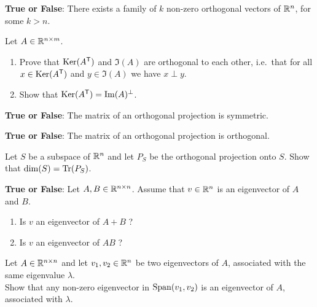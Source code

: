 \documentclass[11pt,nocut]{article}
\begin{document}
\vspace{0.2cm}
\begin{problem}
	\textbf{True or False}: There exists a family of $k$ non-zero orthogonal vectors of $\mathbb{R}^n$, for some $k>n$.
\end{problem}
\vspace{0.2cm}
\begin{problem}
	Let $A \in \mathbb{R}^{n \times m}$.
	\begin{enumerate}
		\item Prove that ${{\rm Ker}}(A^{{\sf T}})$ and $\Im(A)$ are orthogonal to each other, i.e.\ that for all $x \in {{\rm Ker}}(A^{{\sf T}})$ and $y \in \Im(A)$ we have $x \perp y$.
		\item Show that ${{\rm Ker}}(A^{{\sf T}}) = {{\rm Im}}(A)^{\perp}$.
	\end{enumerate}
\end{problem}
\vspace{0.2cm}
\begin{problem}
	\textbf{True or False}: The matrix of an orthogonal projection is symmetric.
\end{problem}
\vspace{0.2cm}
\begin{problem}
	\textbf{True or False}: The matrix of an orthogonal projection is orthogonal.
\end{problem}
\vspace{0.2cm}
\begin{problem}
	Let $S$ be a subspace of $\mathbb{R}^n$ and let $P_S$ be the orthogonal projection onto $S$. Show that ${{\rm dim}}(S) = {{\rm Tr}}(P_S)$.
\end{problem}
\vspace{0.2cm}
\begin{problem}
	\textbf{True or False}: Let $A,B \in \mathbb{R}^{n \times n}$. Assume that $v \in \mathbb{R}^n$ is an eigenvector of $A$ and $B$.
	\begin{enumerate}
		\item Is $v$ an eigenvector of $A+B$ ?
		\item Is $v$ an eigenvector of $AB$ ?
	\end{enumerate}
\end{problem}
\vspace{0.2cm}
\begin{problem}
	Let $A\in \mathbb{R}^{n \times n}$ and let $v_1,v_2 \in \mathbb{R}^n$ be two eigenvectors of $A$, associated with the same eigenvalue $\lambda$.
	\\
	Show that any non-zero eigenvector in ${{\rm Span}}(v_1,v_2)$ is an eigenvector of $A$, associated with $\lambda$.
\end{problem}
\end{document}
